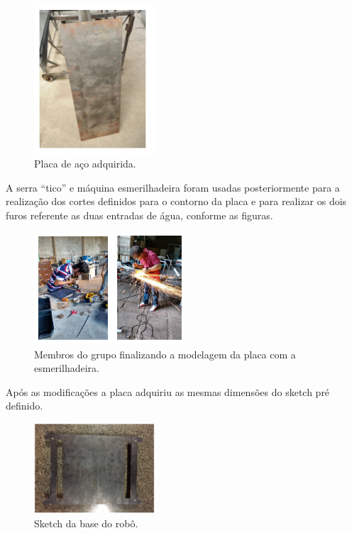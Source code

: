 \par
\begin{figure}[h]
  \centering
  \includegraphics[width=0.4\textwidth]{figures/placa.png}
  \caption{Placa de aço adquirida.}
  \label{fig:placa}
\end{figure}
\FloatBarrier
\par

A serra “tico” e máquina esmerilhadeira foram usadas posteriormente para a realização dos cortes definidos para o contorno da placa e para realizar os dois furos referente as duas entradas de água, conforme as figuras. 

\par
\begin{figure}[h]
  \centering
  \includegraphics[width=0.5\textwidth]{figures/workers.png}
  \caption{Membros do grupo finalizando a modelagem da placa com a esmerilhadeira.}
  \label{fig:workers}
\end{figure}
\FloatBarrier
\par

Após as modificações a placa adquiriu as mesmas dimensões do sketch pré definido.

\par
\begin{figure}[h]
  \centering
  \includegraphics[width=0.4\textwidth]{figures/sketch-base.png}
  \caption{Sketch da base do robô.}
  \label{fig:sketch-base}
\end{figure}
\FloatBarrier
\par

